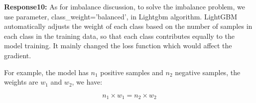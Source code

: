 \documentclass{article}
\begin{document}
\textbf{Response10:}
As for imbalance discussion, to solve the imbalance problem, we use parameter, class\_weight='balanced', in Lightgbm algorithm. LightGBM automatically adjusts the weight of each class based on the number of samples in each class in the training data, so that each class contributes equally to the model training. It mainly changed the loss function which would affect the gradient.

For example, the model has $n_1$ positive samples and $n_2$ negative samples, the weights are $w_1$ and $w_2$, we have:

$$n_1\times w_1 = n_2 \times w_2$$













\end{document}

